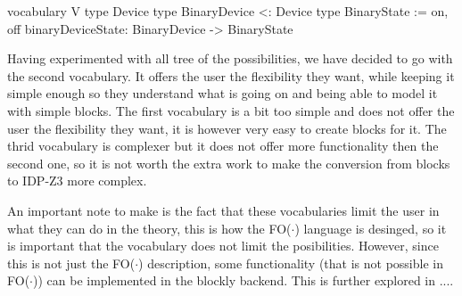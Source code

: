 \documentclass[11pt,a4paper]{report}
\newcommand{\fodot}{FO($\cdot$)\xspace}
\begin{document}
\begin{idplisting}
vocabulary V {
type Device
type BinaryDevice <: Device
type BinaryState := {on, off}
binaryDeviceState: BinaryDevice -> BinaryState    
}
\end{idplisting}
Having experimented with all tree of the possibilities, we have decided to go with the second vocabulary. It offers the user the flexibility they want, while keeping it simple enough so they understand what is going on and being able to model it with simple blocks. The first vocabulary is a bit too simple and does not offer the user the flexibility they want, it is however very easy to create blocks for it. The thrid vocabulary is complexer but it does not offer more functionality then the second one, so it is not worth the extra work to make the conversion from blocks to IDP-Z3 more complex.

An important note to make is the fact that these vocabularies limit the user in what they can do in the theory, this is how the \fodot language is desinged, so it is important that the vocabulary does not limit the posibilities. However, since this is not just the \fodot description, some functionality (that is not possible in \fodot) can be implemented in the blockly backend. This is further explored in ....

\printbibliography
\end{document}
